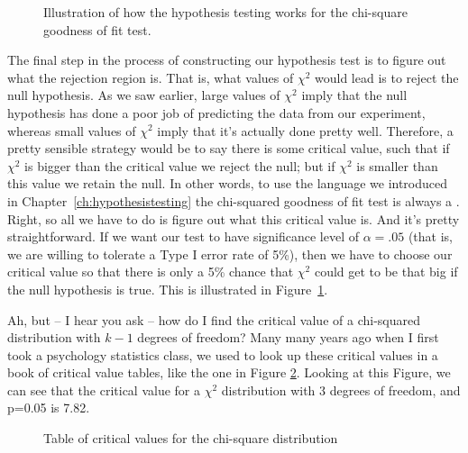 

\begin{figure}
\begin{center}
\caption{Illustration of how the hypothesis testing works for the chi-square goodness of fit test.}
\label{fig:goftest}
\HR
\end{center}
\end{figure}

The final step in the process of constructing our hypothesis test is to figure out what the rejection region is. That is, what values of $\chi^2$ would lead is to reject the null hypothesis. As we saw earlier, large values of $\chi^2$ imply that the null hypothesis has done a poor job of predicting the data from our experiment, whereas small values of $\chi^2$ imply that it's actually done pretty well. Therefore, a pretty sensible strategy would be to say there is some critical value, such that if $\chi^2$ is bigger than the critical value we reject the null; but if $\chi^2$ is smaller than this value we retain the null. In other words, to use the language we introduced in Chapter~\ref{ch:hypothesistesting} the chi-squared goodness of fit test is always a . Right, so all we have to do is figure out what this critical value is. And it's pretty straightforward. If we want our test to have significance level of $\alpha = .05$ (that is, we are willing to tolerate a Type I error rate of 5\%), then we have to choose our critical value so that there is only a 5\% chance that $\chi^2$ could get to be that big if the null hypothesis is true. This is illustrated in Figure~\ref{fig:goftest}.

Ah, but -- I hear you ask -- how do I find the critical value of a chi-squared distribution with $k-1$ degrees of freedom? Many many years ago when I first took a psychology statistics class, we used to look up these critical values in a book of critical value tables, like the one in Figure \ref{fig:chisquare.critvalues}. Looking at this Figure, we can see that the critical value for a $\chi^2$ distribution with 3 degrees of freedom, and p=0.05 is 7.82. 

\begin{figure}
\begin{center}
\caption{Table of critical values for the chi-square distribution}
\label{fig:chisquare.critvalues}
\HR
\end{center}
\end{figure}

